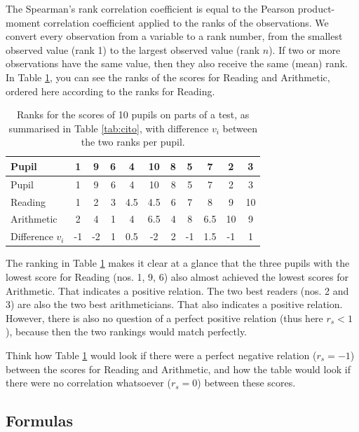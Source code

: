 \documentclass[
]{book}
\begin{document}
The Spearman's rank correlation coefficient is equal to the Pearson
product-moment correlation coefficient applied to the ranks of
the observations. We convert every observation from a variable to
a rank number, from the smallest observed value (rank 1)
to the largest observed value (rank \(n\)). If two or more observations
have the same value, then they also receive the same
(mean) rank. In
Table \ref{tab:cito-ranks}, you can see the ranks of the scores for Reading
and Arithmetic, ordered here according to the ranks for Reading.

\begin{longtable}[]{@{}lccrccrcccc@{}}
\caption{\label{tab:cito-ranks} Ranks for the scores of 10 pupils on parts of a test, as summarised in
Table \ref{tab:cito}, with difference \(v_i\) between the two ranks per pupil.}\tabularnewline
\toprule
Pupil & 1 & 9 & 6 & 4 & 10 & 8 & 5 & 7 & 2 & 3 \\
\midrule
\endfirsthead
\toprule
Pupil & 1 & 9 & 6 & 4 & 10 & 8 & 5 & 7 & 2 & 3 \\
\midrule
\endhead
Reading & 1 & 2 & 3 & 4.5 & 4.5 & 6 & 7 & 8 & 9 & 10 \\
Arithmetic & 2 & 4 & 1 & 4 & 6.5 & 4 & 8 & 6.5 & 10 & 9 \\
Difference \(v_i\) & -1 & -2 & 1 & 0.5 & -2 & 2 & -1 & 1.5 & -1 & 1 \\
\bottomrule
\end{longtable}

The ranking in Table \ref{tab:cito-ranks} makes it clear at a glance that
the three pupils with the lowest score for Reading (nos. 1, 9, 6) also almost achieved
the lowest scores for Arithmetic. That indicates a positive
relation. The two best readers (nos. 2 and 3) are also the two best
arithmeticians. That also indicates a positive relation. However, there is
also no question of a perfect positive relation (thus here \(r_s<1\)), because
then the two rankings would match perfectly.

Think how Table \ref{tab:cito-ranks} would look if there were a perfect
negative relation (\(r_s=-1\)) between the scores for Reading and
Arithmetic, and how the table would look if there were no correlation whatsoever
(\(r_s=0\)) between these scores.

\hypertarget{formulas-4}{%
\subsection{Formulas}\label{formulas-4}}
\end{document}
